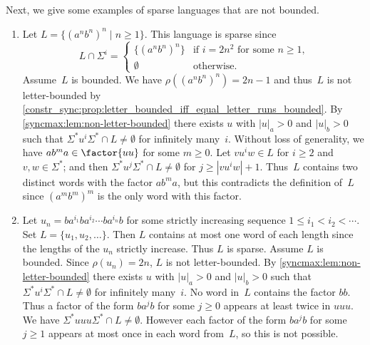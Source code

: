Next, we give some examples of sparse languages that are not bounded.

\begin{example} \label{syncmax:growth:ex:sparse-not-bounded}
	\begin{enumerate}
		\item Let $L = \{ (a^n b^n)^n \mid n \ge 1 \}$.
		This language is sparse since
		\[
		L \cap \Sigma^i = 
		\begin{cases}
			\{ (a^n b^n)^n \} & \text{if $i = 2n^2$ for some $n \ge 1$,} \\
			\emptyset         & \text{otherwise.}  	
		\end{cases}
		\]
		Assume~$L$ is bounded.
		We have $\rho( (a^n b^n)^n ) = 2n - 1$
		and thus~$L$ is not letter-bounded by \cref{constr_sync:prop:letter_bounded_iff_equal_letter_runs_bounded}.
		By \cref{syncmax:lem:non-letter-bounded}
		there exists $u$ with $|u|_a > 0$ and $|u|_b > 0$
		such that $\Sigma^* u^i \Sigma^* \cap L \ne \emptyset$ 
		for infinitely many~$i$.
		Without loss of generality, we have $ab^ma \in \factor{uu}$
		for some $m \ge 0$.
	    Let $vu^iw \in L$ for $i \ge 2$ and $v,w \in \Sigma^*$;
	    and then $\Sigma^* u^j \Sigma^* \cap L \ne \emptyset$
	    for $j \ge |vu^iw| + 1$.
	    Thus~$L$ contains two distinct words with the factor $ab^ma$,
	    but this contradicts the definition of~$L$
	    since $(a^m b^m)^m$ is the only word with this factor.
		
		\item Let $u_n = b a^{i_1} b a^{i_2} \cdots b a^{i_n}b$
		for some strictly increasing sequence $1 \le i_1 < i_2 < \cdots$.
		Set $L = \{ u_1, u_2, \ldots\}$.
		Then $L$ contains at most one word of each length
		since the lengths of the $u_n$ strictly increase.
		Thus $L$ is sparse.
		Assume $L$ is bounded. Since $\rho(u_n) = 2n$, $L$ is not letter-bounded.
		By \cref{syncmax:lem:non-letter-bounded}
		there exists $u$ with $|u|_a > 0$ and $|u|_b > 0$
		such that $\Sigma^* u^i \Sigma^* \cap L \ne \emptyset$ 
		for infinitely many~$i$.
		No word in~$L$ contains the factor $bb$.
		Thus a factor of the form $ba^jb$ for some $j \ge 0$ appears
		at least twice in $uuu$.
		We have $\Sigma^* uuu \Sigma^* \cap L \ne \emptyset$.
		However each factor of the form $ba^jb$ for some $j \ge 1$
		appears at most once in each word from~$L$,
		so this is not possible.
		

\end{enumerate}
\end{example}
